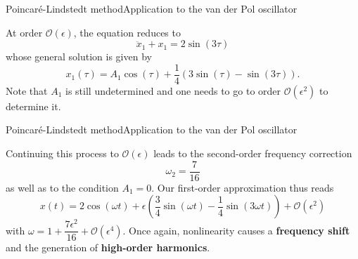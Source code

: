 \documentclass[usenames,dvipsnames,svgnames,10pt,aspectratio=169]{beamer}
\begin{document}
\begin{frame}[t, c]{Poincaré-Lindstedt method}{Application to the van der Pol oscillator}
  \begin{minipage}{.68\textwidth}
    At order $\mathcal{O}(\epsilon)$, the equation reduces to
    \[
    \ddot{x}_1 + x_1 =  2 \sin(3\tau)
    \]
    whose general solution is given by
    \[
    x_1(\tau) = A_1 \cos(\tau) + \dfrac{1}{4} \left( 3 \sin(\tau) - \sin(3\tau) \right).
    \]
    Note that $A_1$ is still undetermined and one needs to go to order $\mathcal{O}(\epsilon^2)$ to determine it.
  \end{minipage}%
  \hfill
  \begin{minipage}{.28\textwidth}
    \centering
  \end{minipage}

  \vspace{1cm}
\end{frame}

\begin{frame}[t, c]{Poincaré-Lindstedt method}{Application to the van der Pol oscillator}
  \begin{minipage}{.68\textwidth}
    Continuing this process to $\mathcal{O}(\epsilon)$ leads to the second-order frequency correction
    \[
    \omega_2 =  \dfrac{7}{16}
    \]
    as well as to the condition $A_1 = 0$.
    Our first-order approximation thus reads
    \[
    x(t) = 2 \cos(\omega t) + \epsilon \left( \dfrac{3}{4} \sin(\omega t) - \dfrac{1}{4} \sin(3\omega t) \right) + \mathcal{O}(\epsilon^2)
    \]
    with $\omega = 1 + \dfrac{7\epsilon^2}{16} + \mathcal{O}(\epsilon^4)$.
    Once again, nonlinearity causes a \alert{\textbf{frequency shift}} and the generation of \alert{\textbf{high-order harmonics}}.
  \end{minipage}%
  \hfill
  \begin{minipage}{.28\textwidth}
    \centering
  \end{minipage}

  \vspace{1cm}
\end{frame}
\end{document}
